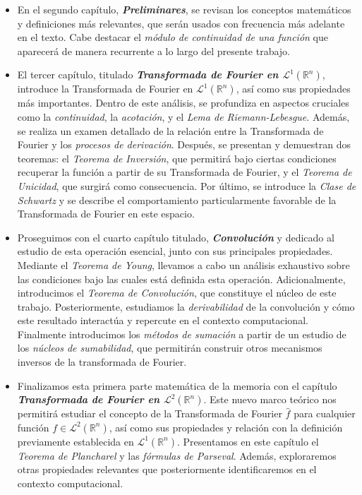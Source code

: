 \begin{itemize}
    
    \item En el segundo capítulo, \textit{\textbf{Preliminares}}, se revisan los conceptos matemáticos y definiciones más relevantes, que serán usados con frecuencia más adelante en el texto. Cabe destacar el \textit{módulo de continuidad de una función} que aparecerá de manera recurrente a lo largo del presente trabajo.


    \item El tercer capítulo, titulado \textit{\textbf{Transformada de Fourier en $\mathscr{L}^1(\mathbb{R}^n)$}}, introduce la 
     Transformada de Fourier en $\mathscr{L}^1(\mathbb{R}^n)$, así como sus propiedades más importantes.  Dentro de este análisis, se profundiza en aspectos cruciales como la \textit{continuidad}, la \textit{acotación}, y el \textit{Lema de Riemann-Lebesgue}. Además, se realiza un examen detallado de la relación entre la Transformada de Fourier y los \textit{procesos de derivación}. Después, se presentan y demuestran dos teoremas: el \textit{Teorema de Inversión}, que permitirá bajo ciertas condiciones recuperar la función a partir de su Transformada de Fourier, y el \textit{Teorema de Unicidad}, que surgirá como consecuencia.
     Por último, se introduce la \textit{Clase de Schwartz} y se describe el comportamiento particularmente favorable de la Transformada de Fourier en este espacio.

      
    \item Proseguimos con el cuarto capítulo titulado, \textbf{\textit{Convolución}} y dedicado al estudio de esta operación esencial, junto con sus principales propiedades. Mediante el \textit{Teorema de Young}, llevamos a cabo un análisis exhaustivo sobre las condiciones bajo las cuales está definida esta operación. Adicionalmente, introducimos el \textit{Teorema de Convolución}, que constituye el núcleo de este trabajo. Posteriormente, estudiamos la \textit{derivabilidad} de la convolución y cómo este resultado interactúa y repercute en el contexto computacional.
    Finalmente introducimos los \textit{métodos de sumación} a partir de un estudio de los \textit{núcleos de sumabilidad}, que permitirán construir otros mecanismos inversos de la transformada de Fourier.

    \item Finalizamos esta primera parte matemática de la memoria con el capítulo \textit{\textbf{Transformada de Fourier en $\mathscr{L}^2(\mathbb{R}^n)$}}. Este nuevo marco teórico nos permitirá estudiar el concepto de la Transformada de Fourier $\widehat{f}$ para cualquier función $f \in  \mathscr{L}^2(\mathbb{R}^n)$, así como sus propiedades y relación con la definición previamente establecida en $\mathscr{L}^1(\mathbb{R}^n)$. Presentamos en este capítulo el \textit{Teorema de Plancharel} y las \textit{fórmulas de Parseval}.
    Además, exploraremos otras propiedades relevantes que posteriormente identificaremos en el contexto computacional.
\end{itemize}



